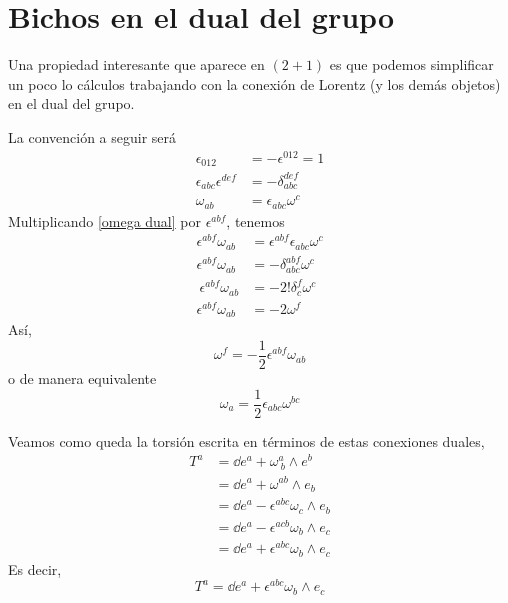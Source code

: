 \section{Bichos en el dual del grupo}
Una propiedad interesante que aparece en $(2+1)$ es que podemos simplificar un poco lo cálculos trabajando con la conexión de Lorentz (y los demás objetos) en el dual del grupo. 

La convención a seguir será
\begin{align}
  \epsilon_{012}&=-\epsilon^{012}=1\\
  \epsilon_{abc}\epsilon^{def}&=-\delta_{abc}^{def}\\
  \omega_{ab}&=\epsilon_{abc}\omega^c\label{omega dual}
\end{align}
Multiplicando \eqref{omega dual} por $\epsilon^{abf}$, tenemos
\begin{align}
  \epsilon^{abf}\omega_{ab}&=\epsilon^{abf}\epsilon_{abc}\omega^c\\
  \epsilon^{abf}\omega_{ab}&=-\delta_{abc}^{abf}\omega^c\\\
  \epsilon^{abf}\omega_{ab}&=-2!\delta^f_c\omega^c\\
  \epsilon^{abf}\omega_{ab}&=-2\omega^f
\end{align}
Así, 
\begin{equation}
  \omega^{f}=-\frac{1}{2}\epsilon^{abf}\omega_{ab}
\end{equation}
o de manera equivalente
\begin{equation}
  \boxed{\omega_a=\frac{1}{2}\epsilon_{abc}\omega^{bc}}
\end{equation}

Veamos como queda la torsión escrita en términos de estas conexiones duales,
\begin{align}
  T^{a}&=\dd e^{a}+\omega^{a}_{~b}\wedge e^b\\
  &=\dd e^{a}+\omega^{ab}\wedge e_b\\
  &=\dd e^{a}-\epsilon^{abc}\omega_c\wedge e_b\\
  &=\dd e^{a}-\epsilon^{acb}\omega_b\wedge e_c\\
  &=\dd e^{a}+\epsilon^{abc} \omega_b\wedge e_c
\end{align}
Es decir,
\begin{equation}
	\boxed{T^{a}=\dd e^{a}+\epsilon^{abc} \omega_b\wedge e_c}
\end{equation}

